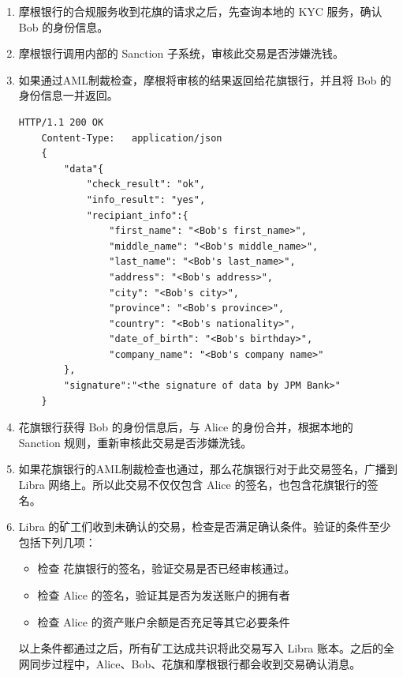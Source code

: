 \begin{enumerate}
    \item 摩根银行的合规服务收到花旗的请求之后，先查询本地的 KYC 服务，确认 Bob 的身份信息。

    \item 摩根银行调用内部的 Sanction 子系统，审核此交易是否涉嫌洗钱。

    \item 如果通过AML制裁检查，摩根将审核的结果返回给花旗银行，并且将 Bob 的身份信息一并返回。

    \begin{lstlisting}[caption={摩根银行向花旗银行返回审核结果}, label={lst:jpm_reply}]
    HTTP/1.1 200 OK
    Content-Type:   application/json
    {
        "data"{
            "check_result": "ok",
            "info_result": "yes",
            "recipiant_info":{
                "first_name": "<Bob's first_name>",
                "middle_name": "<Bob's middle_name>",
                "last_name": "<Bob's last_name>",
                "address": "<Bob's address>",
                "city": "<Bob's city>",
                "province": "<Bob's province>",
                "country": "<Bob's nationality>",
                "date_of_birth": "<Bob's birthday>",
                "company_name": "<Bob's company name>"
        },
        "signature":"<the signature of data by JPM Bank>"
    }
    \end{lstlisting}

    \item 花旗银行获得 Bob 的身份信息后，与 Alice 的身份合并，根据本地的 Sanction 规则，重新审核此交易是否涉嫌洗钱。

    \item 如果花旗银行的AML制裁检查也通过，那么花旗银行对于此交易签名，广播到 Libra 网络上。所以此交易不仅仅包含 Alice 的签名，也包含花旗银行的签名。

    \item Libra 的矿工们收到未确认的交易，检查是否满足确认条件。验证的条件至少包括下列几项：
        \begin{itemize}
            \item   检查 花旗银行的签名，验证交易是否已经审核通过。
            \item   检查 Alice 的签名，验证其是否为发送账户的拥有者
            \item   检查 Alice 的资产账户余额是否充足等其它必要条件
        \end{itemize}
        以上条件都通过之后，所有矿工达成共识将此交易写入 Libra 账本。之后的全网同步过程中，Alice、Bob、花旗和摩根银行都会收到交易确认消息。


\end{enumerate}
